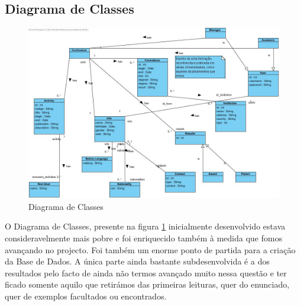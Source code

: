 \documentclass[a4paper,11pt,openright,openbib]{article}
\begin{document}
\subsection{Diagrama de Classes}
\begin{figure}[!ht]
\centering
\includegraphics[scale=.4]{Diagrama_Classes.jpg}
\caption{Diagrama de Classes}
\label{fig:diagramadeclasses}
\end{figure}
O Diagrama de Classes, presente na figura \ref{fig:diagramadeclasses} inicialmente desenvolvido estava consideravelmente mais pobre e foi enriquecido também à medida que fomos avançando no projecto. Foi também um enorme ponto de partida para a criação da Base de Dados. A única parte ainda bastante subdesenvolvida é a dos resultados pelo facto de ainda não termos avançado muito nessa questão e ter ficado somente aquilo que retirámos das primeiras leituras, quer do enunciado, quer de exemplos facultados ou encontrados.
\end{document}
